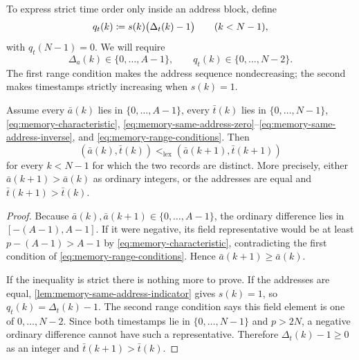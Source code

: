 To express strict time order only inside an address block, define
\begin{equation}
  q_t(k)
  \coloneqq
  s(k)\bigl(\Delta_t(k)-1\bigr)
  \qquad (k<N-1),
  \label{eq:memory-time-range-table}
\end{equation}
with $q_t(N-1)=0$.  We will require
\begin{equation}
  \Delta_a(k)\in\{0,\ldots,A-1\},
  \qquad
  q_t(k)\in\{0,\ldots,N-2\}.
  \label{eq:memory-range-conditions}
\end{equation}
The first range condition makes the address sequence nondecreasing; the second makes timestamps strictly increasing when $s(k)=1$.

\begin{lemma}
\label{lem:memory-lexicographic-order}
Assume every $\bar a(k)$ lies in $\{0,\ldots,A-1\}$, every $\bar t(k)$ lies in $\{0,\ldots,N-1\}$, \eqref{eq:memory-characteristic}, \eqref{eq:memory-same-address-zero}--\eqref{eq:memory-same-address-inverse}, and \eqref{eq:memory-range-conditions}.  Then
\begin{equation}
  (\bar a(k),\bar t(k))
  <_{\mathrm{lex}}
  (\bar a(k+1),\bar t(k+1))
  \label{eq:memory-lex-order}
\end{equation}
for every $k<N-1$ for which the two records are distinct.  More precisely, either $\bar a(k+1)>\bar a(k)$ as ordinary integers, or the addresses are equal and $\bar t(k+1)>\bar t(k)$.
\end{lemma}

\begin{proof}
Because $\bar a(k),\bar a(k+1)\in\{0,\ldots,A-1\}$, the ordinary difference lies in $[-(A-1),A-1]$.  If it were negative, its field representative would be at least $p-(A-1)>A-1$ by \eqref{eq:memory-characteristic}, contradicting the first condition of \eqref{eq:memory-range-conditions}.  Hence $\bar a(k+1)\ge\bar a(k)$.

If the inequality is strict there is nothing more to prove.  If the addresses are equal, \cref{lem:memory-same-address-indicator} gives $s(k)=1$, so $q_t(k)=\Delta_t(k)-1$.  The second range condition says this field element is one of $0,\ldots,N-2$.  Since both timestamps lie in $\{0,\ldots,N-1\}$ and $p>2N$, a negative ordinary difference cannot have such a representative.  Therefore $\Delta_t(k)-1\ge0$ as an integer and $\bar t(k+1)>\bar t(k)$.
\end{proof}

